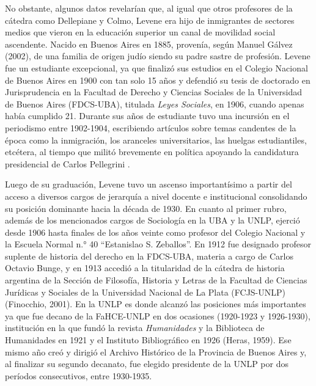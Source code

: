 No obstante, algunos datos revelarían que, al igual que otros profesores de la cátedra como Dellepiane y Colmo, Levene era hijo de inmigrantes de sectores medios que vieron en la educación superior un canal de movilidad social ascendente. Nacido en Buenos Aires en 1885, provenía, según Manuel Gálvez (2002), de una familia de origen judío siendo su padre sastre de profesión. Levene fue un estudiante excepcional, ya que finalizó sus estudios en el Colegio Nacional de Buenos Aires en 1900 con tan solo 15 años \parencite{1530-RAJMANOVICH2016} y defendió su tesis de doctorado en Jurisprudencia en la Facultad de Derecho y Ciencias Sociales de la Universidad de Buenos Aires (FDCS-UBA), titulada \emph{Leyes Sociales}, en 1906, cuando apenas había cumplido 21. Durante sus años de estudiante tuvo una incursión en el periodismo entre 1902-1904, escribiendo artículos sobre temas candentes de la época como la inmigración, los aranceles universitarios, las huelgas estudiantiles, etcétera, al tiempo que militó brevemente en política apoyando la candidatura presidencial de Carlos Pellegrini \parencite{1526-RODRIGUEZ2001}.

Luego de su graduación, Levene tuvo un ascenso importantísimo a partir del acceso a diversos cargos de jerarquía a nivel docente e institucional consolidando su posición dominante hacia la década de 1930. En cuanto al primer rubro, además de los mencionados cargos de Sociología en la UBA y la UNLP, ejerció desde 1906 hasta finales de los años veinte como profesor del Colegio Nacional y la Escuela Normal n.° 40 \enquote{Estanislao S. Zeballos}. En 1912 fue designado profesor suplente de historia del derecho en la FDCS-UBA, materia a cargo de Carlos Octavio Bunge, y en 1913 accedió a la titularidad de la cátedra de historia argentina de la Sección de Filosofía, Historia y Letras de la Facultad de Ciencias Jurídicas y Sociales de la Universidad Nacional de La Plata (FCJS-UNLP) (Finocchio, 2001). En la UNLP es donde alcanzó las posiciones más importantes ya que fue decano de la FaHCE-UNLP en dos ocasiones (1920-1923 y 1926-1930), institución en la que fundó la revista \emph{Humanidades} y la Biblioteca de Humanidades en 1921 y el Instituto Bibliográfico en 1926 (Heras, 1959). Ese mismo año creó y dirigió el Archivo Histórico de la Provincia de Buenos Aires y, al finalizar su segundo decanato, fue elegido presidente de la UNLP por dos períodos consecutivos, entre 1930-1935.


